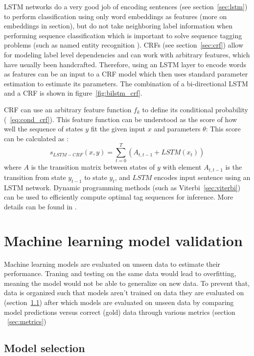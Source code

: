 LSTM networks do a very good job of encoding sentences
(see section~\ref{sec:lstm}) to perform classification using only 
word embeddings as features (more on embeddings in section),
but do not take neighboring label information when performing sequence
classification which is important to solve sequence tagging
problems (such as named entity recognition \citep{nadeau2007survey}).
CRFs (see section~\ref{sec:crf}) allow for modeling label level 
dependencies and can work with arbitrary features, which have usually been
handcrafted.
Therefore, using an LSTM layer to encode words as features can be an input to a
CRF model which then uses standard 
parameter estimation to estimate its parameters. 
The combination of a bi-directional LSTM and a CRF is shown in figure~\ref{fig:bilstm_crf}.

CRF can use an arbitrary feature function $f_k$
to define its conditional probability (~\ref{eq:cond_crf}).
This feature function can 
be understood as the score of how well the sequence 
of states $y$ fit the given input $x$ and parameters $\theta$:
This score can be calculated as
:
$$
s_{LSTM-CRF}(x, y) = \sum_{t=0}^{T} \left( A_{t, t-1} + LSTM(x_t) \right)
$$
where $A$ is the transition matrix between states of $y$ with element
$A_{t, t-1}$ is the transition from state $y_{t-1}$ to state $y_{t}$, and $LSTM$
encodes input sentence using an LSTM network.
Dynamic programming methods (such as Viterbi~\ref{sec:viterbi}) can be used 
to efficiently compute optimal tag sequences
for inference. More details can be found in \citep{huang2015bidirectional}.

\section{Machine learning model validation}

Machine learning models are evaluated on unseen data
to estimate their performance. Traning and testing on the same
data would lead to overfitting, meaning the model would
not be able to generalize on new data. 
To prevent that, 
data is organized such that 
 models aren't trained on data they are evaluated on
(section~\ref{sec:selection})
after which models are evaluated on unseen data by 
comparing model predictions versus correct (gold) data
through various metrics (section ~\ref{sec:metrics})

\subsection{Model selection}
\label{sec:selection}

